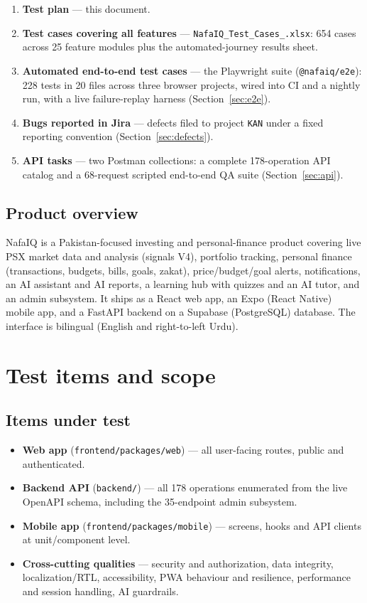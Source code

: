 \documentclass[11pt,a4paper]{article}
\begin{document}
\begin{enumerate}
  \item \textbf{Test plan} --- this document.
  \item \textbf{Test cases covering all features} --- \texttt{NafaIQ\_Test\_Cases\_.xlsx}:
        654 cases across 25 feature modules plus the automated-journey results sheet.
  \item \textbf{Automated end-to-end test cases} --- the Playwright suite
        (\texttt{@nafaiq/e2e}): 228 tests in 20 files across three browser projects,
        wired into CI and a nightly run, with a live failure-replay harness
        (Section~\ref{sec:e2e}).
  \item \textbf{Bugs reported in Jira} --- defects filed to project \texttt{KAN}
        under a fixed reporting convention (Section~\ref{sec:defects}).
  \item \textbf{API tasks} --- two Postman collections: a complete 178-operation
        API catalog and a 68-request scripted end-to-end QA suite
        (Section~\ref{sec:api}).
\end{enumerate}

\subsection{Product overview}
NafaIQ is a Pakistan-focused investing and personal-finance product covering
live PSX market data and analysis (signals V4), portfolio tracking, personal
finance (transactions, budgets, bills, goals, zakat), price/budget/goal alerts,
notifications, an AI assistant and AI reports, a learning hub with quizzes and
an AI tutor, and an admin subsystem. It ships as a React web app, an Expo
(React Native) mobile app, and a FastAPI backend on a Supabase (PostgreSQL)
database. The interface is bilingual (English and right-to-left Urdu).

\section{Test items and scope}

\subsection{Items under test}
\begin{itemize}
  \item \textbf{Web app} (\texttt{frontend/packages/web}) --- all user-facing routes,
        public and authenticated.
  \item \textbf{Backend API} (\texttt{backend/}) --- all 178 operations enumerated
        from the live OpenAPI schema, including the 35-endpoint admin subsystem.
  \item \textbf{Mobile app} (\texttt{frontend/packages/mobile}) --- screens, hooks
        and API clients at unit/component level.
  \item \textbf{Cross-cutting qualities} --- security and authorization, data
        integrity, localization/RTL, accessibility, PWA behaviour and resilience,
        performance and session handling, AI guardrails.
\end{itemize}
\end{document}
